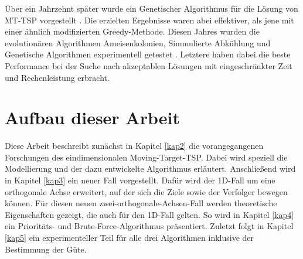 \documentclass[german,version-2019-11]{uzl-thesis}
\begin{document}
Über ein Jahrzehnt später wurde ein Genetischer Algorithmus für die Lösung von MT-TSP vorgestellt \cite{choubey2013moving}. Die erzielten Ergebnisse waren abei effektiver, als jene mit einer ähnlich modifizierten Greedy-Methode. Diesen Jahres wurden die evolutionären Algorithmen  \cite{weicker2015evolutionare} Ameisenkolonien, Simmulierte Abkühlung und Genetische Algorithmen experimentell getestet \cite{moraes}. Letztere haben dabei die beste Performance bei der Suche nach akzeptablen Lösungen mit eingeschränkter Zeit und Rechenleistung erbracht.

\section{Aufbau dieser Arbeit}
Diese Arbeit beschreibt zunächst in Kapitel \ref{kap2} die vorangegangenen Forschungen des eindimensionalen Moving-Target-TSP. Dabei wird speziell die Modellierung und der dazu entwickelte Algorithmus erläutert. Anschließend wird in Kapitel \ref{kap3} ein neuer Fall vorgestellt. Dafür wird der 1D-Fall um eine orthogonale Achse erweitert, auf der sich die Ziele sowie der Verfolger bewegen können. Für diesen neuen zwei-orthogonale-Achsen-Fall werden theoretische Eigenschaften gezeigt, die auch für den 1D-Fall gelten. So wird in Kapitel \ref{kap4} ein Prioritäts- und Brute-Force-Algorithmus präsentiert. Zuletzt folgt in Kapitel \ref{kap5} ein experimenteller Teil für alle drei Algorithmen inklusive der Bestimmung der Güte.

\end{document}
